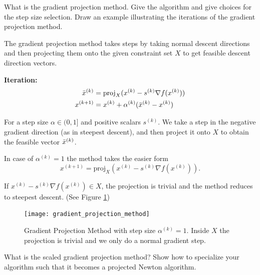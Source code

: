 \documentclass[12pt,a4paper]{article}
\begin{document}
\begin{question}
What is the gradient projection method. Give the algorithm and give choices for the step size selection. Draw an example illustrating the iterations of the gradient projection method.
\end{question}


The gradient projection method takes steps by taking normal descent directions and then projecting them onto the given constraint set $X$ to get feasible descent direction vectors.

\textbf{Iteration:}
\begin{align*}
    \Bar{x}^{(k)} &= {\text{proj}}_{X}(x^{(k)} - s^{(k)} \nabla f(x^{(k)}))\\
    x^{(k+1)} &= x^{(k)} + \alpha^{(k)} (\Bar{x}^{(k)} - x^{(k)})
\end{align*}

For a step size $\alpha \in (0,1]$ and positive scalars $s^{(k)}$.
We take a step in the negative gradient direction (as in steepest descent), and then project it onto $X$ to obtain the feasible vector $\Bar{x}^{(k)}$.

In case of $\alpha^{(k)} = 1$ the method takes the easier form
\begin{equation*}
    x^{(k+1)} = \text{proj}_{X} (x^{(k)} - s^{(k)} \nabla f(x^{(k)})).
\end{equation*}

If $x^{(k)} - s^{(k)} \nabla f(x^{(k)}) \in X$, the projection is trivial and the method reduces to steepest descent. (See Figure \ref{fig:grad_proj_method})

\begin{figure}[H]
    \centering
    \texttt{[image: gradient\_projection\_method]}
    \caption{Gradient Projection Method with step size $\alpha^{(k)} = 1$. Inside $X$ the projection is trivial and we only do a normal gradient step.}
    \label{fig:grad_proj_method}
\end{figure}

\begin{question}
What is the scaled gradient projection method? Show how to specialize your algorithm such that it becomes a projected Newton algorithm.
\end{question}
\end{document}
